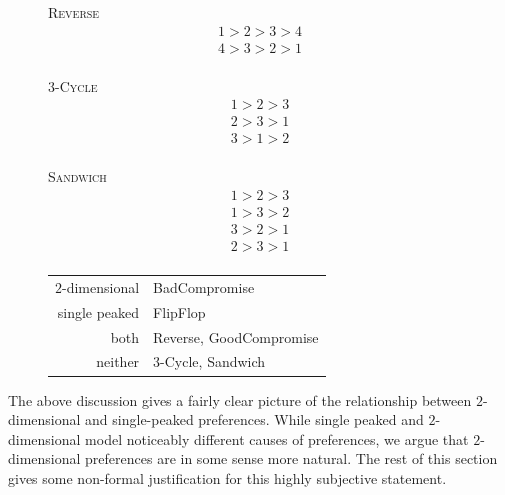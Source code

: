 \documentclass[12pt]{article}
\newcommand{\1}[1]{\mathds{1}[{#1}]}
\begin{document}
  \begin{figure}[H]
    \begin{minipage}{0.15\textwidth}
      \centering
      {\textsc{Reverse}}
      \begin{align*}
        1 > 2 > 3 > 4 \\
        4 > 3 > 2 > 1 \\
      \end{align*}
    \end{minipage}\hfill
    \begin{minipage}{0.15\textwidth}
      \centering
      {$3$-\textsc{Cycle}}
      \begin{align*}
        1 > 2 > 3 \\
        2 > 3 > 1 \\
        3 > 1 > 2 \\
      \end{align*}
    \end{minipage}\hfill
    \begin{minipage}{0.15\textwidth}
      \centering
      {\textsc{Sandwich}}
      \begin{align*}
        1 > 2 > 3 \\
        1 > 3 > 2 \\
        3 > 2 > 1 \\
        2 > 3 > 1 \\
      \end{align*}
    \end{minipage}\hfill
    \begin{minipage}{0.55\textwidth}
      \centering
      \begin{tabular}{ r | l }
        $2$-dimensional & {\sc BadCompromise} \\
        single peaked & {\sc FlipFlop} \\
        both & {\sc Reverse}, {\sc GoodCompromise} \\
        neither & $3$-{\sc Cycle}, {\sc Sandwich} \\
      \end{tabular}
    \end{minipage}\hfill
  \end{figure}

  The above discussion gives a fairly clear picture of the relationship between
  $2$-dimensional and single-peaked preferences.
  While single peaked and $2$-dimensional model noticeably different causes of
  preferences, we argue that $2$-dimensional preferences are in some sense more
  natural. The rest of this section gives some non-formal justification
  for this highly subjective statement.
\end{document}
